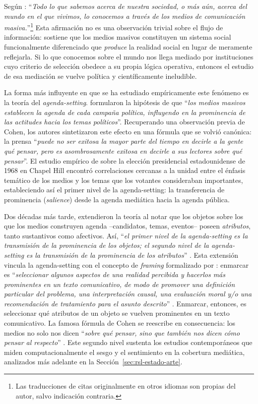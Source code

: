 \documentclass[12pt]{report}
\begin{document}
Según \citet[p.~1]{luhmann2000}: ``\textit{Todo lo que sabemos acerca de nuestra sociedad, o más aún, acerca del mundo en el que vivimos, lo conocemos a través de los medios de comunicación masiva.}''\footnote{Las traducciones de citas originalmente en otros idiomas son propias del autor, salvo indicación contraria.} Esta afirmación no es una observación trivial sobre el flujo de información: \citet{luhmann2000} sostiene que los medios masivos constituyen un sistema social funcionalmente diferenciado que \textit{produce} la realidad social en lugar de meramente reflejarla. Si lo que conocemos sobre el mundo nos llega mediado por instituciones cuyo criterio de selección obedece a su propia lógica operativa, entonces el estudio de esa mediación se vuelve política y científicamente ineludible.

La forma más influyente en que se ha estudiado empíricamente este fenómeno es la teoría del \textit{agenda-setting}. \citet{mccombs:1972} formularon la hipótesis de que ``\textit{los medios masivos establecen la agenda de cada campaña política, influyendo en la prominencia de las actitudes hacia los temas políticos}''. Recuperando una observación previa de Cohen, los autores sintetizaron este efecto en una fórmula que se volvió canónica: la prensa ``\textit{puede no ser exitosa la mayor parte del tiempo en decirle a la gente qué pensar, pero es asombrosamente exitosa en decirle a sus lectores sobre qué pensar}''. El estudio empírico de \citet{mccombs:1972} sobre la elección presidencial estadounidense de 1968 en Chapel Hill encontró correlaciones cercanas a la unidad entre el énfasis temático de los medios y los temas que los votantes consideraban importantes, estableciendo así el primer nivel de la agenda-setting: la transferencia de prominencia (\textit{salience}) desde la agenda mediática hacia la agenda pública.

Dos décadas más tarde, \citet{mccombs:1997} extendieron la teoría al notar que los objetos sobre los que los medios construyen agenda --candidatos, temas, eventos-- poseen \textit{atributos}, tanto sustantivos como afectivos. Así, ``\textit{el primer nivel de la agenda-setting es la transmisión de la prominencia de los objetos; el segundo nivel de la agenda-setting es la transmisión de la prominencia de los atributos}'' \citep[p.~704]{mccombs:1997}. Esta extensión vincula la agenda-setting con el concepto de \textit{framing} formalizado por \citet{entman:1993}: enmarcar es ``\textit{seleccionar algunos aspectos de una realidad percibida y hacerlos más prominentes en un texto comunicativo, de modo de promover una definición particular del problema, una interpretación causal, una evaluación moral y/o una recomendación de tratamiento para el asunto descrito}'' \citep[p.~52]{entman:1993}. Enmarcar, entonces, es seleccionar qué atributos de un objeto se vuelven prominentes en un texto comunicativo. La famosa fórmula de Cohen se reescribe en consecuencia: los medios no solo nos dicen ``\textit{sobre qué pensar, sino que también nos dicen cómo pensar al respecto}'' \citep[p.~716]{mccombs:1997}. Este segundo nivel sustenta los estudios contemporáneos que miden computacionalmente el sesgo y el sentimiento en la cobertura mediática, analizados más adelante en la Sección~\ref{sec:rsl-estado-arte}.
\end{document}

